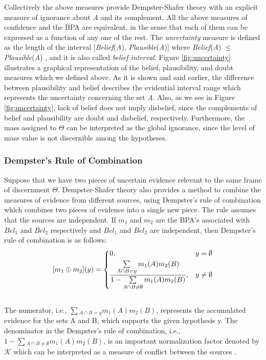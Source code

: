 \documentclass[11pt]{article}
\begin{document}
Collectively the above measures provide Dempster-Shafer theory with an explicit
measure of ignorance about \textit{A} and its complement. All the above measures
of confidence and the BPA are equivalent, in the sense that each of them can be
expressed as a function of any one of the rest. The \textit{uncertainty}
measure is defined as the length of the interval [\textit{Belief}(\textit{A}),
\textit{Plausible}(\textit{A})] where \textit{Belief}(\textit{A}) $\leqslant$
\textit{Plausible}(\textit{A}) \cite{yager:dst-combination-rules}, and it is
also called \textit{belief interval}. Figure \ref{fig:uncertainty} illustrates a
graphical representation of the belief, plausibility, and doubt measures which
we defined above. As it is shown and said earlier, the difference between
plausibility and belief describes the evidential interval range which represents
the uncertainty concerning the set \textit{A}. Also, as we see in Figure
\ref{fig:uncertainty}, lack of belief does not imply disbelief, since the
complements of belief and plausibility are doubt and disbelief, respectively.
Furthermore, the mass assigned to $\Theta$ can be interpreted as the global
ignorance, since the level of mass value is not discernible among the
hypotheses.

\subsubsection{Dempster's Rule of Combination}

Suppose that we have two pieces of uncertain evidence relevant to the same frame
of discernment $\Theta$. Dempster-Shafer theory also provides a method to
combine the measures of evidence from different sources, using Dempster's rule
of combination which combines two pieces of evidence into a single new piece.
The rule assumes that the sources are independent. If $m_1$ and $m_2$ are the
BPA's associated with $Bel_1$ and $Bel_2$ respectively and $Bel_1$ and $Bel_2$
are independent, then Dempster's rule of combination is as follows:\\

\[
	[m_1 \oplus m_2](y) = 
    \begin{dcases}
      0, & y = \emptyset \\
      \frac{\sum\limits_{A \cap B = y}m_1(A)m_2(B)}{1-\sum\limits_{A
      \cap B \neq \emptyset}m_1(A)m_2(B)}, & y
      \neq
      \emptyset
	\end{dcases}
\]\\

\noindent The numerator, i.e., $\sum\limits{_{A \cap B =y}}m_1(A)m_2(B)$,
represents the accumulated evidence for the sets A and B, which supports the
given hypothesis y. The denominator in the Dempster's rule of combination, i.e.,
$1-\sum\limits{_{A \cap B \neq \emptyset}}m_1(A)m_2(B)$, is an important
normalization factor denoted by $\mathcal{K}$ which can be interpreted as a
measure of conflict between the sources
\cite{srivastava:evidential-reasoning-uncertainty}.
\end{document}
